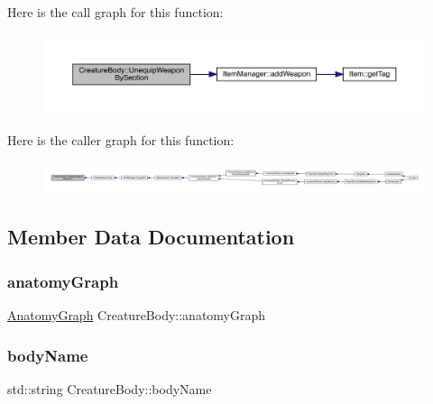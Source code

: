 Here is the call graph for this function\+:
\nopagebreak
\begin{figure}[H]
\begin{center}
\leavevmode
\includegraphics[width=350pt]{da/d7d/class_creature_body_a4cd14d7e1ed54d8beeb853a99ff0516c_cgraph}
\end{center}
\end{figure}
Here is the caller graph for this function\+:
\nopagebreak
\begin{figure}[H]
\begin{center}
\leavevmode
\includegraphics[width=350pt]{da/d7d/class_creature_body_a4cd14d7e1ed54d8beeb853a99ff0516c_icgraph}
\end{center}
\end{figure}


\subsection{Member Data Documentation}
\mbox{\label{class_creature_body_aa0fc6dc283a463e31f34c0ce9c2f1182}} 
\subsubsection{\texorpdfstring{anatomy\+Graph}{anatomyGraph}}
{\footnotesize\ttfamily \mbox{\hyperlink{_body_graph_8hpp_ab01b157c2e143191570b012d275fbf0d}{Anatomy\+Graph}} Creature\+Body\+::anatomy\+Graph}

\mbox{\label{class_creature_body_a9d0be8de94783d95307a80fe0acf7aa9}} 
\subsubsection{\texorpdfstring{body\+Name}{bodyName}}
{\footnotesize\ttfamily std\+::string Creature\+Body\+::body\+Name\hspace{0.3cm}{\ttfamily [private]}}

